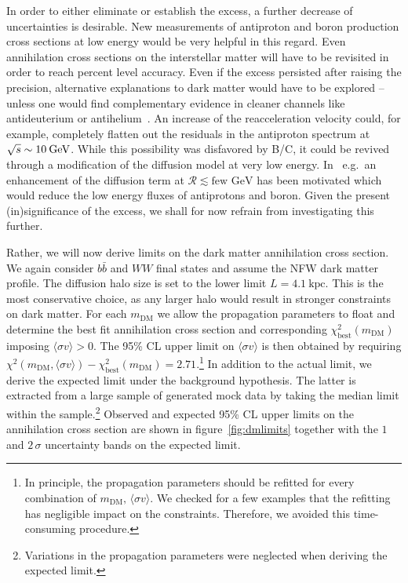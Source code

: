\documentclass[a4paper,11pt]{article}
\newcommand{\eVdist}{\kern-0.06em}
\newcommand{\gev}{\:\text{Ge\eVdist V}}
\newcommand{\kpc}{\:\text{kpc}}
\newcommand{\R}{\mathcal{R}}
\begin{document}
In order to either eliminate or establish the excess, a further decrease of uncertainties is desirable. New measurements of antiproton and boron production cross sections at low energy would be very helpful in this regard. Even annihilation cross sections on the interstellar matter will have to be revisited in order to reach percent level accuracy. Even if the excess persisted after raising the precision, alternative explanations to dark matter would have to be explored -- unless one would find complementary evidence in cleaner channels like antideuterium or antihelium~\cite{Korsmeier:2017xzj}. An increase of the reacceleration velocity could, for example, completely flatten out the residuals in the antiproton spectrum at $\sqrt{s}\sim 10\gev$. While this possibility was disfavored by B/C, it could be revived through a modification of the diffusion model at very low energy. In~\cite{Jones:2000qd,Ptuskin:2005ax} e.g.\ an enhancement of the diffusion term at $\R\lesssim \text{few GeV}$ has been motivated which would reduce the low energy fluxes of antiprotons and boron. Given the present (in)significance of the excess, we shall for now refrain from investigating this further. 

Rather, we will now derive limits on the dark matter annihilation cross section. We again consider $b\bar{b}$ and $WW$ final states and assume the NFW dark matter profile. The diffusion halo size is set to the lower limit $L=4.1\kpc$. This is the most conservative choice, as any larger halo would result in stronger constraints on dark matter. For each $m_{\text{DM}}$ we allow the propagation parameters to float and determine the best fit annihilation cross section and corresponding $\chi^2_\text{best}(m_{\text{DM}})$ imposing $\langle \sigma v \rangle > 0$. The 95\% CL upper limit on $\langle \sigma v \rangle$ is then obtained by requiring $\chi^2(m_{\text{DM}},\langle \sigma v\rangle)-\chi^2_\text{best}(m_{\text{DM}})=2.71$.\footnote{In principle, the propagation parameters should be refitted for every combination of $m_{\text{DM}},\,\langle \sigma v\rangle$. We checked for a few examples that the refitting has negligible impact on the constraints. Therefore, we avoided this time-consuming procedure.} In addition to the actual limit, we derive the expected limit under the background hypothesis. The latter is extracted from a large sample of generated mock data by taking the median limit within the sample.\footnote{Variations in the propagation parameters were neglected when deriving the expected limit.} Observed and expected 95\% CL upper limits on the annihilation cross section are shown in figure~\ref{fig:dmlimits} together with the $1$ and $2\,\sigma$ uncertainty bands on the expected limit.
\end{document}
